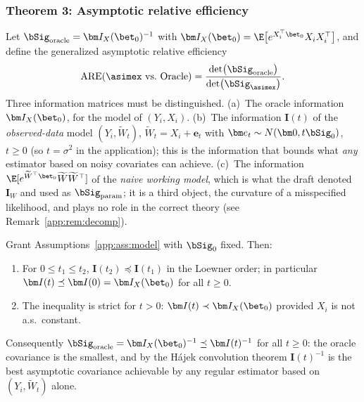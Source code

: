 \subsubsection{Theorem 3: Asymptotic relative efficiency}\label{app:sec:are}

Let $\bSig_{\mathrm{oracle}}=\bm I_X(\bet_0)^{-1}$ with
$\bm I_X(\bet_0)=\E\bigl[e^{X_i^\top\bet_0}X_iX_i^\top\bigr]$, and define
the generalized asymptotic relative efficiency
\[
  \mathrm{ARE}(\asimex\text{ vs.\ Oracle})
  =\frac{\det\bigl(\bSig_{\mathrm{oracle}}\bigr)}
        {\det\bigl(\bSig_{\asimex}\bigr)} .
\]
Three information matrices must be distinguished. (a)~The oracle
information $\bm I_X(\bet_0)$, for the model of $(Y_i,X_i)$. (b)~The
information $\bm I(t)$ of the \emph{observed-data} model
$(Y_i,\widetilde W_t)$, $\widetilde W_t=X_i+\bm e_t$ with
$\bm e_t\sim N(\bm 0,t\bSig_0)$, $t\ge0$ (so $t=\sigma^2$ in the
application); this is the information that bounds what \emph{any}
estimator based on noisy covariates can achieve. (c)~The information
$\E[e^{\widetilde W^\top\bet_0}\widetilde W\widetilde W^\top]$ of the
\emph{naive working model}, which is what the draft denoted
$\bm I_W$ and used as $\bSig_{\mathrm{param}}$; it is a third object,
the curvature of a misspecified likelihood, and plays no role in the
correct theory (see Remark~\ref{app:rem:decomp}).

\begin{lemma}\label{app:lem:info}
Grant Assumptions~\ref{app:ass:model} with $\bSig_0$ fixed. Then:
\begin{enumerate}\itemsep2pt
\item[(i)] For $0\le t_1\le t_2$, $\bm I(t_2)\preceq\bm I(t_1)$ in the
      Loewner order; in particular $\bm I(t)\preceq\bm I(0)=\bm I_X(\bet_0)$
      for all $t\ge0$.
\item[(ii)] The inequality is strict for $t>0$: $\bm I(t)\prec\bm I_X(\bet_0)$
      provided $X_i$ is not a.s.\ constant.
\end{enumerate}
Consequently $\bSig_{\mathrm{oracle}}=\bm I_X(\bet_0)^{-1}
\preceq\bm I(t)^{-1}$ for all $t\ge0$: the oracle covariance is the
smallest, and by the H\'ajek convolution theorem
$\bm I(t)^{-1}$ is the best asymptotic covariance achievable by any
regular estimator based on $(Y_i,\widetilde W_t)$ alone.
\end{lemma}

